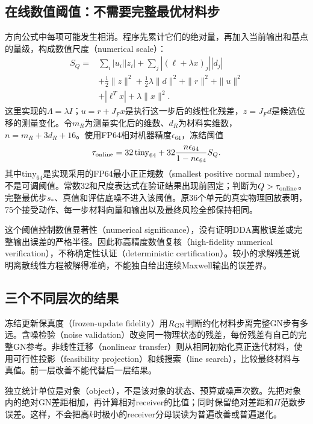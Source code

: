 \subsection{在线数值阈值：不需要完整最优材料步}
方向公式中每项可能发生相消。程序先累计它们的绝对量，再加入当前输出和基点的量级，构成数值尺度（numerical scale）：
\begin{align*}
S_Q={}&\sum_i|u_i||z_i|+\sum_j|(\ell+\lambda x)_j||d_j|\\
&+\tfrac12\|z\|^2+\tfrac12\lambda\|d\|^2+\|r\|^2+\|u\|^2\\
&+|\ell^Tx|+\lambda\|x\|^2.
\end{align*}
这里实现的$\Lambda=\lambda I$；$u=r+J_Fx$是执行这一步后的线性化残差，$z=J_Fd$是候选位移的测量变化。令$m_R$为测量实化后的维数、$d_R$为材料实维数，$n=m_R+3d_R+16$。使用FP64相对机器精度$\epsilon_{64}$，冻结阈值
\[
\tau_{\rm online}=32\,\mathrm{tiny}_{64}
+32\frac{n\epsilon_{64}}{1-n\epsilon_{64}}S_Q.
\]
其中$\mathrm{tiny}_{64}$是实现采用的FP64最小正正规数（smallest positive normal number），不是可调阈值。常数32和尺度表达式在验证结果出现前固定；判断为$Q>\tau_{\rm online}$。完整最优步$s_*$、真值和评估底噪不进入该阈值。原36个单元的真实物理回放表明，75个接受动作、每一步材料向量和输出以及最终风险全部保持相同。

这个阈值控制数值显著性（numerical significance），没有证明DDA离散误差或完整输出误差的严格半径。因此称高精度数值复核（high-fidelity numerical verification），不称确定性认证（deterministic certification）。较小的求解残差说明离散线性方程被解得准确，不能独自给出连续Maxwell输出的误差界。

\subsection{三个不同层次的结果}
冻结更新保真度（frozen-update fidelity）用$R_{\rm GN}$判断约化材料步离完整GN步有多远。含噪检验（noise validation）改变同一物理状态的残差，每份残差有自己的完整GN参考。非线性迁移（nonlinear transfer）则从相同初始化真正迭代材料，使用可行性投影（feasibility projection）和线搜索（line search），比较最终材料与真值。前一层改善不能代替后一层结果。

独立统计单位是对象（object），不是该对象的状态、预算或噪声次数。先把对象内的绝对GN差距相加，再计算相对receiver的比值；同时保留绝对差距和$H$范数步误差。这样，不会把高$k$时极小的receiver分母误读为普遍改善或普遍退化。
